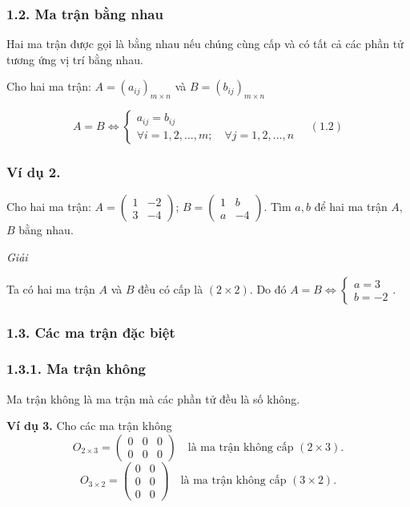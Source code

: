 \subsubsection*{1.2. Ma trận bằng nhau}
Hai ma trận được gọi là bằng nhau nếu chúng cùng cấp và có tất cả các phần tử tương ứng vị trí bằng nhau.

Cho hai ma trận: \( A = (a_{ij})_{m \times n} \) và \( B = (b_{ij})_{m \times n} \)

\[
A = B \Leftrightarrow \begin{cases}
a_{ij} = b_{ij} \\
\forall i = 1, 2, ..., m; \quad \forall j = 1, 2, ..., n
\end{cases} \quad (1.2)
\]
\subsubsection*{Ví dụ 2.}
Cho hai ma trận: \( A = \begin{pmatrix}
1 & -2 \\
3 & -4
\end{pmatrix} \);
\( B = \begin{pmatrix}
1 & b \\
a & -4
\end{pmatrix} \).
Tìm \( a, b \) để hai ma trận \( A \), \( B \) bằng nhau.

\textit{Giải}

Ta có hai ma trận \( A \) và \( B \) đều có cấp là \( (2 \times 2) \). Do đó \( A = B \Leftrightarrow \begin{cases}
a = 3 \\
b = -2
\end{cases} \).

\subsubsection*{1.3. Các ma trận đặc biệt}
\subsubsection*{1.3.1. Ma trận không}
Ma trận không là ma trận mà các phần tử đều là số không.

\textbf{Ví dụ 3.}
Cho các ma trận không
\[
O_{2 \times 3} = \begin{pmatrix}
0 & 0 & 0 \\
0 & 0 & 0
\end{pmatrix} \quad \text{là ma trận không cấp } (2 \times 3).
\]
\[
O_{3 \times 2} = \begin{pmatrix}
0 & 0 \\
0 & 0 \\
0 & 0
\end{pmatrix} \quad \text{là ma trận không cấp } (3 \times 2).
\]
